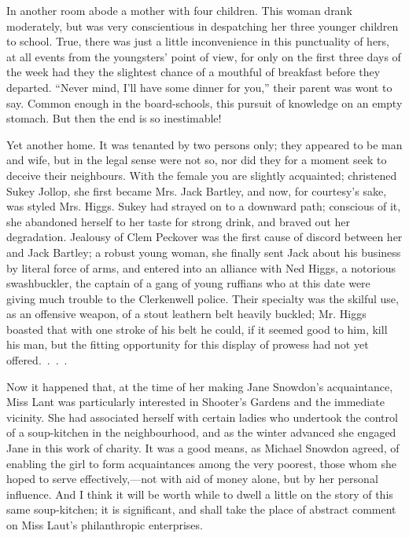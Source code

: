 In another room abode a mother with four children. This woman drank
moderately, but was very conscientious in despatching her three younger
children to school. True, there was just a little inconvenience in this
punctuality of hers, at all events from the youngsters' point of view,
for only on the first three days of the week had they the slightest
chance of a mouthful of breakfast before they departed. ``Never mind,
I'll have some dinner for you,'' their parent was wont to say. Common
enough {\protect\hypertarget{7}{}{}}in the board-schools, this pursuit
of knowledge on an empty stomach. But then the end is so inestimable!

Yet another home. It was tenanted by two persons only; they appeared to
be man and wife, but in the legal sense were not so, nor did they for a
moment seek to deceive their neighbours. With the female you are
slightly acquainted; christened Sukey Jollop, she first became Mrs. Jack
Bartley, and now, for courtesy's sake, was styled Mrs. Higgs. Sukey had
strayed on to a downward path; conscious of it, she abandoned herself to
her taste for strong drink, and braved out her degradation. Jealousy of
Clem Peckover was the first cause of discord between her and Jack
Bartley; a robust young woman, she finally sent Jack about his business
by literal force of arms, and entered into an alliance with Ned Higgs, a
notorious swashbuckler, the captain of a gang of young ruffians who at
this date were giving much trouble to the Clerkenwell police. Their
specialty was the skilful use, as an offensive weapon, of a stout
leathern belt heavily buckled; Mr. Higgs boasted that with one stroke of
his belt he could, if it seemed good {\protect\hypertarget{8}{}{}}to
him, kill his man, but the fitting opportunity for this display of
prowess had not yet offered{.~.~.~.}

Now it happened that, at the time of her making Jane Snowdon's
acquaintance, Miss Lant was particularly interested in Shooter's Gardens
and the immediate vicinity. She had associated herself with certain
ladies who undertook the control of a soup-kitchen in the neighbourhood,
and as the winter advanced she engaged Jane in this work of charity. It
was a good means, as Michael Snowdon agreed, of enabling the girl to
form acquaintances among the very poorest, those whom she hoped to serve
effectively,---not with aid of money alone, but by her personal
influence. And I think it will be worth while to dwell a little on the
story of this same soup-kitchen; it is significant, and shall take the
place of abstract comment on Miss Laut's philanthropic enterprises.

